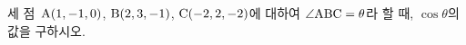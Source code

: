 세 점~$\mathrm{A}(1{,}\mkern3mu\mathopen{}-1{,}\mkern3mu\mathopen{}0)$, $\mathrm{B}(2{,}\mkern3mu\mathopen{}3{,}\mkern3mu\mathopen{}-1)$, $\mathrm{C}(-2{,}\mkern3mu\mathopen{}2{,}\mkern3mu\mathopen{}-2)$에 대하여 $\angle\mathrm{ABC}=\theta$라 할 때, $\cos\theta$의 값을 구하시오.
